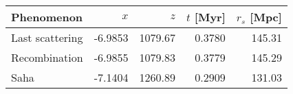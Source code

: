 \begin{tabular}{l|rrrr}
Phenomenon & $x$ & $z$ & $t$ [Myr] & $r_s$ [Mpc] \\
\hline
Last scattering   & -6.9853 & 1079.67 & 0.3780 & 145.31 \\
Recombination     & -6.9855 & 1079.83 & 0.3779 & 145.29 \\
Saha              & -7.1404 & 1260.89 & 0.2909 & 131.03 \\
\hline
\hline
\end{tabular}
